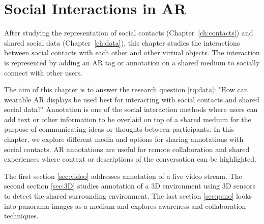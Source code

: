 \chapter{Social Interactions in AR}
\label{ch:annotation}

After studying the representation of social contacts (Chapter~\ref{ch:contacts}) and shared social data (Chapter~\ref{ch:data}), this chapter studies the interactions between social contacts with each other and other virtual objects. The interaction is represented by adding an AR tag or annotation on a shared medium to socially connect with other users.

The aim of this chapter is to answer the research question \ref{rq:data}: "How can wearable AR displays be used best for interacting with social contacts and shared social data?"
Annotation is one of the social interaction methods where users can add text or other information to be overlaid on top of a shared medium for the purpose of communicating ideas or thoughts between participants. In this chapter, we explore different media and options for sharing annotations with social contacts. AR annotations are useful for remote collaboration and shared experiences where context or descriptions of the conversation can be highlighted.

The first section \ref{sec:video} addresses annotation of a live video stream. The second section \ref{sec:3D} studies annotation of a 3D environment using 3D sensors to detect the shared surrounding environment. The last section \ref{sec:pano} looks into panorama images as a medium and explores awareness and collaboration techniques. 





